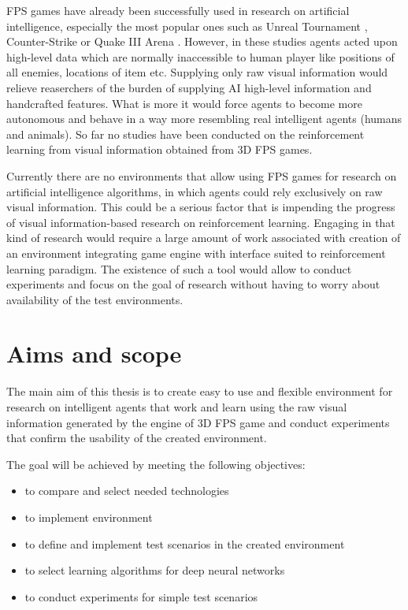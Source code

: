 FPS games have already been successfully used in research on artificial intelligence, especially the most popular ones such as Unreal Tournament \cite{6314567}, \cite{6922494} Counter-Strike \cite{5035619} or Quake III Arena \cite{el2007hybrid}.
However, in these studies agents acted upon high-level data which are normally inaccessible to human player like positions of all enemies, locations of item etc.
Supplying only raw visual information would relieve reaserchers of the burden of supplying AI high-level information and handcrafted features.
What is more it would force agents to become more autonomous and behave in a way more resembling real intelligent agents (humans and animals).
So far no studies have been conducted on the reinforcement learning from visual information obtained from 3D FPS games.


Currently there are no environments that allow using FPS games for research on artificial intelligence algorithms, in which agents could rely exclusively on raw visual information.
This could be a serious factor that is impending the progress of visual information-based research on reinforcement learning.
Engaging in that kind of research would require a large amount of work associated with creation of an environment integrating game engine with interface suited to reinforcement learning paradigm.
The existence of such a tool would allow to conduct experiments and focus on the goal of research without having to worry about availability of the test environments.
 

\section{Aims and scope}


The main aim of this thesis is to create easy to use and flexible environment for research on intelligent agents that work and learn using the raw visual information generated by the engine of 3D FPS game and conduct experiments that confirm the usability of the created environment.

The goal will be achieved by meeting the following objectives:
\begin{itemize}
 \item to compare and select needed technologies
 \item to implement environment
 \item to define and implement test scenarios in the created environment
 \item to select learning algorithms for deep neural networks
 \item to conduct experiments for simple test scenarios
\end{itemize}


